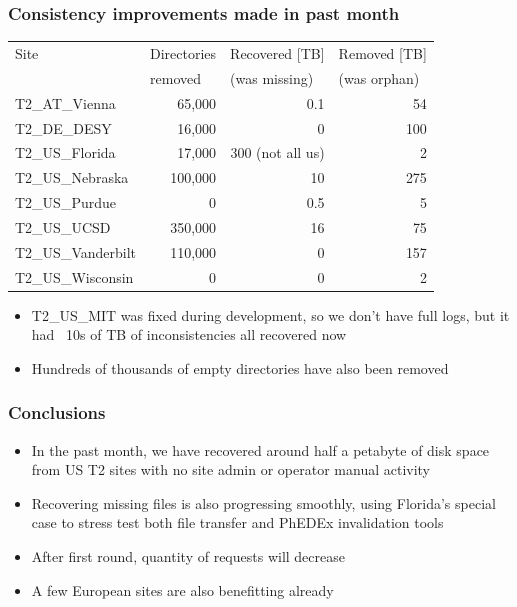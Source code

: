 \documentclass{beamer}
\begin{document}
\begin{frame}
  \frametitle{Consistency improvements made in past month}

  \centering
  {\scriptsize
    \begin{tabular}{l | r | r | r}
      \hline
      Site & \multicolumn{1}{l|}{Directories} & \multicolumn{1}{l|}{Recovered [TB]} & \multicolumn{1}{l}{Removed [TB]} \\
      & \multicolumn{1}{l|}{removed} & \multicolumn{1}{l|}{(was missing)} & \multicolumn{1}{l}{(was orphan)} \\
      \hline
      T2\_AT\_Vienna & 65,000 & 0.1 & 54 \\
      T2\_DE\_DESY & 16,000 & 0 & 100 \\
      T2\_US\_Florida & 17,000 & 300 (not all us) & 2 \\
      T2\_US\_Nebraska & 100,000 & 10 & 275 \\
      \hline
      T2\_US\_Purdue & 0 & 0.5 & 5 \\
      T2\_US\_UCSD & 350,000 & 16 & 75 \\
      T2\_US\_Vanderbilt & 110,000 & 0 & 157 \\
      T2\_US\_Wisconsin & 0 & 0 & 2 \\
      \hline
    \end{tabular}
  }

  \vspace{8pt}
  \begin{itemize}
  \item T2\_US\_MIT was fixed during development, so we don't have full logs,
    but it had ~10s of TB of inconsistencies all recovered now
  \item Hundreds of thousands of empty directories have also been removed
  \end{itemize}

\end{frame}

\begin{frame}
  \frametitle{Conclusions}

  \begin{itemize}
  \item In the past month, we have recovered around half a petabyte of disk space
    from US T2 sites with no site admin or operator manual activity
  \item Recovering missing files is also progressing smoothly,
    using Florida's special case to stress test both file transfer
    and PhEDEx invalidation tools
  \item After first round, quantity of requests will decrease
  \item A few European sites are also benefitting already
  \end{itemize}

\end{frame}
\end{document}
